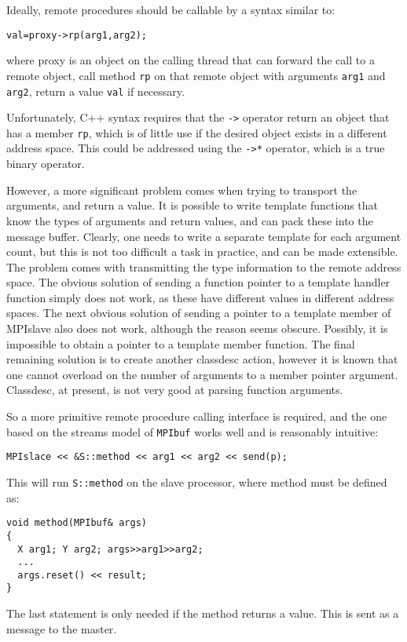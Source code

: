 Ideally, remote procedures should be callable by a syntax similar to:
\begin{verbatim}
val=proxy->rp(arg1,arg2);
\end{verbatim}
where proxy is an object on the calling thread that can forward the
call to a remote object, call method {\tt rp} on that remote object
with arguments {\tt arg1} and {\tt arg2}, return a value {\tt val} if
necessary. 

Unfortunately, C++ syntax requires that the \verb+->+ operator
return an object that has a member {\tt rp}, which is of little use if
the desired object exists in a different address space. This could be
addressed using the \verb+->*+ operator, which is a true binary
operator. 

However, a more significant problem comes when trying to transport the
arguments, and return a value. It is possible to write template
functions that know the types of arguments and return values, and can
pack these into the message buffer. Clearly, one needs to write a
separate template for each argument count, but this is not too
difficult a task in practice, and can be made extensible. The problem
comes with transmitting the type information to the remote address
space. The obvious solution of sending a function pointer to a
template handler function simply does not work, as these have
different values in different address spaces. The next obvious
solution of sending a pointer to a template member of MPIslave also
does not work, although the reason seems obscure. Possibly, it is
impossible to obtain a pointer to a template member function.
The final remaining solution is to create another classdesc action,
however it is known that one cannot overload on the number of
arguments to a member pointer argument. Classdesc, at present, is not
very good at parsing function arguments.

So a more primitive remote procedure calling interface is required,
and the one based on the streams model of {\tt MPIbuf} works well and
is reasonably intuitive:
\begin{verbatim}
MPIslace << &S::method << arg1 << arg2 << send(p);
\end{verbatim}
This will run {\tt S::method} on the slave processor, where method
must be defined as:
\begin{verbatim}
void method(MPIbuf& args)
{
  X arg1; Y arg2; args>>arg1>>arg2;
  ...
  args.reset() << result;
}
\end{verbatim}

The last statement is only needed if the method returns a value. This
is sent as a message to the master.

